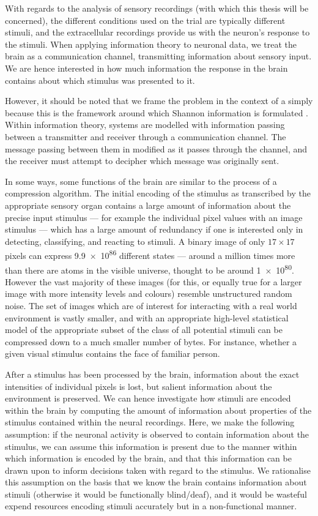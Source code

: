 With regards to the analysis of sensory recordings (with which this thesis will be concerned), the different conditions used on the trial are typically different stimuli, and the extracellular recordings provide us with the neuron's response to the stimuli.
When applying information theory to neuronal data, we treat the brain as a communication channel, transmitting information about sensory input.
We are hence interested in how much information the response in the brain contains about which stimulus was presented to it.

However, it should be noted that we frame the problem in the context of a  simply because this is the framework around which Shannon information is formulated \citep{mackay2003information}.
Within information theory, systems are modelled with information passing between a transmitter and receiver through a communication channel.
The message passing between them in modified as it passes through the channel, and the receiver must attempt to decipher which message was originally sent.

In some ways, some functions of the brain are similar to the process of a compression algorithm.
The initial encoding of the stimulus as transcribed by the appropriate sensory organ contains a large amount of information about the precise input stimulus --- for example the individual pixel values with an image stimulus --- which has a large amount of redundancy if one is interested only in detecting, classifying, and reacting to stimuli.
A binary image of only $17 \times 17$ pixels can express \num{9.9e86} different states --- around a million times more than there are atoms in the visible universe, thought to be around \num{1e80}.
However the vast majority of these images (for this, or equally true for a larger image with more intensity levels and colours) resemble unstructured random noise.
The set of images which are of interest for interacting with a real world environment is vastly smaller, and with an appropriate high-level statistical model of the appropriate subset of the class of all potential stimuli can be compressed down to a much smaller number of bytes.
For instance, whether a given visual stimulus contains the face of familiar person.

After a stimulus has been processed by the brain, information about the exact intensities of individual pixels is lost, but salient information about the environment is preserved.
We can hence investigate how stimuli are encoded within the brain by computing the amount of information about properties of the stimulus contained within the neural recordings.
Here, we make the following assumption: if the neuronal activity is observed to contain information about the stimulus, we can assume this information is present due to the manner within which information is encoded by the brain, and that this information can be drawn upon to inform decisions taken with regard to the stimulus.
We rationalise this assumption on the basis that we know the brain contains information about stimuli (otherwise it would be functionally blind/deaf), and it would be wasteful expend resources encoding stimuli accurately but in a non-functional manner.

